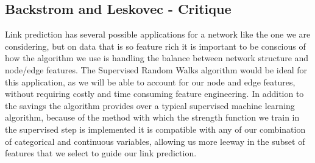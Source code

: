 \subsection{Backstrom and Leskovec - Critique}

Link prediction has several possible applications for a network like the one 
we are considering, but on data that is so feature rich it is important to be 
conscious of how the algorithm we use is handling the balance between network 
structure and node/edge features.  The Supervised Random Walks algorithm would
be ideal for this application, as we will be able to account for our node and 
edge features, without requiring costly and time consuming feature engineering. 
In addition to the savings the algorithm provides over a typical supervised
machine learning algorithm, because of the method with which the strength 
function we train in the supervised step is implemented it is compatible with 
any of our combination of categorical and continuous variables, allowing us more
leeway in the subset of features that we select to guide our link prediction.



